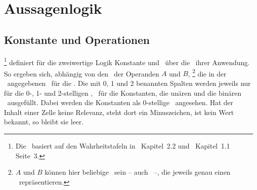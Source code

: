 \section{Aussagenlogik}%
\label{sec:Aussagenlogik}

\subsection{Konstante und Operationen}%
\label{sub:Operationen}

%
\footnote{%
	Die \tablename\ basiert auf den Wahrheitstafeln in~\cite{bib:Junktor} Kapitel~2.2 und~\cite{bib:Rautenberg} Kapitel~1.1 Seite~3.
}
definiert für die zweiwertige Logik Konstante und \Junktoren\ über die \Wahrheitswerte\ ihrer Anwendung.
So ergeben sich, abhängig von den \Wahrheitswerten\ der Operanden $A$ und $B$,%
\footnote{%
	$A$ und $B$ können hier beliebige \Aussagen\ sein -- auch \Formeln\ --, die jeweils genau einen \Wahrheitswert\ repräsentieren.
}
die in der \tablename\ angegebenen \Wahrheitswerte\ für die \Operationen.
Die mit 0, 1 und 2 benannten Spalten werden jeweils nur für die 0-, 1- und 2-stelligen \Junktoren, \textdh\ für die Konstanten, die unären und die binären \Junktoren\ ausgefüllt.
Dabei werden die Konstanten als 0-stellige \Junktoren\ angesehen.
Hat der Inhalt einer Zelle keine Relevanz, steht dort ein Minuszeichen, ist kein Wert bekannt, so bleibt sie leer.


